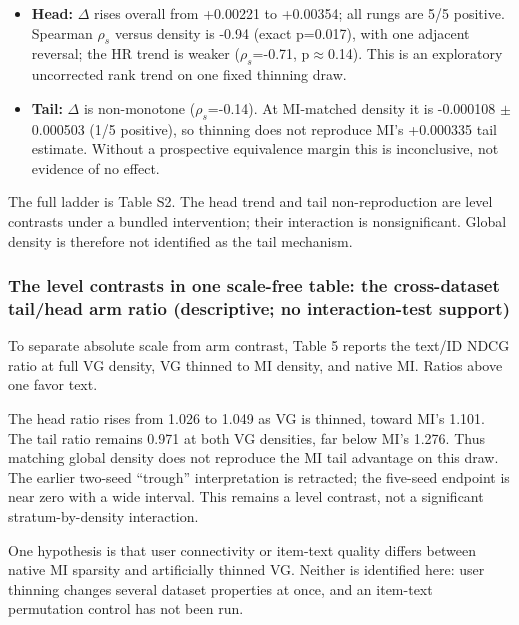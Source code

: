 \begin{itemize}
\tightlist
\item
  \textbf{Head:} \ensuremath{\Delta} rises overall from +0.00221 to +0.00354;
  all rungs are 5/5 positive. Spearman \ensuremath{\rho_s} versus density is
  -0.94 (exact p=0.017), with one adjacent reversal; the HR trend is weaker
  (\ensuremath{\rho_s}=-0.71, p\ensuremath{\approx}0.14). This is an
  exploratory uncorrected rank trend on one fixed thinning draw.
\item
  \textbf{Tail:} \ensuremath{\Delta} is non-monotone
  (\ensuremath{\rho_s}=-0.14). At MI-matched density it is -0.000108
  \ensuremath{\pm}0.000503 (1/5 positive), so thinning does not reproduce MI's
  +0.000335 tail estimate. Without a prospective equivalence margin this is
  inconclusive, not evidence of no effect.
\end{itemize}



The full ladder is Table S2. The head trend and tail non-reproduction are level
contrasts under a bundled intervention; their interaction is nonsignificant. Global
density is therefore not identified as the tail mechanism.


\subsubsection{The level contrasts in one scale-free table: the cross-dataset tail/head arm ratio (descriptive; no interaction-test support)}\label{sec:5.4.1}


To separate absolute scale from arm contrast, Table 5 reports the text/ID NDCG ratio
at full VG density, VG thinned to MI density, and native MI. Ratios above one
favor text.





The head ratio rises from 1.026 to 1.049 as VG is thinned, toward MI's 1.101.
The tail ratio remains 0.971 at both VG densities, far below MI's 1.276. Thus
matching global density does not reproduce the MI tail advantage on this draw. The
earlier two-seed ``trough'' interpretation is retracted; the five-seed endpoint is near
zero with a wide interval. This remains a level contrast, not a significant
stratum-by-density interaction.

One hypothesis is that user connectivity or item-text quality differs between native
MI sparsity and artificially thinned VG. Neither is identified here: user thinning
changes several dataset properties at once, and an item-text permutation control has
not been run.



